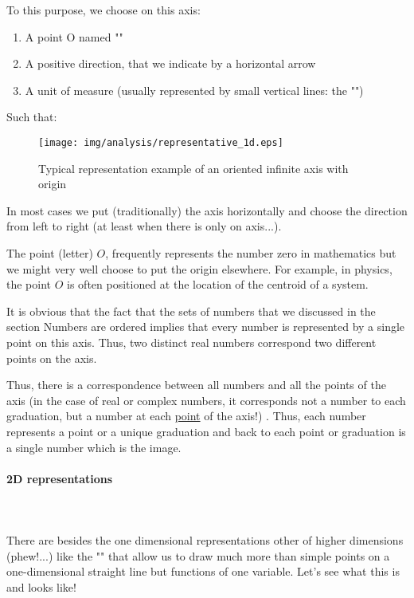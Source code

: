 	To this purpose, we choose on this axis:
	\begin{enumerate}
		\item A point O named ""
		\item A positive direction, that we indicate by a horizontal arrow
		\item A unit of measure (usually represented by small vertical lines: the "")
	\end{enumerate}
Such that:
\begin{figure}[H]
\centering
\texttt{[image: img/analysis/representative\_1d.eps]}
\caption{Typical representation example of an oriented infinite axis with origin}
\end{figure}
In most cases we put (traditionally) the axis horizontally and choose the direction from left to right (at least when there is only on axis...).
	\begin{tcolorbox}[title=Remark,colframe=black,arc=10pt]
The point (letter) $O$, frequently represents the number zero in mathematics but we might very well choose to put the origin elsewhere. For example, in physics, the point $O$ is often positioned at the location of the centroid of a system. 
	\end{tcolorbox}
It is obvious that the fact that the sets of numbers that we discussed in the section Numbers are ordered implies that every number is represented by a single point on this axis. Thus, two distinct real numbers correspond two different points on the axis.

Thus, there is a correspondence between all numbers and all the points of the axis (in the case of real or complex numbers, it corresponds not a number to each graduation, but a number at each \underline{point} of the axis!) . Thus, each number represents a point or a unique graduation and back to each point or graduation is a single number which is the image.

\pagebreak
\paragraph{2D representations}\mbox{}\\\\
There are besides the one dimensional representations other of higher dimensions (phew!...) like the "" that allow us to draw much more than simple points on a one-dimensional straight line but functions of one variable. Let's see what this is and looks like!

